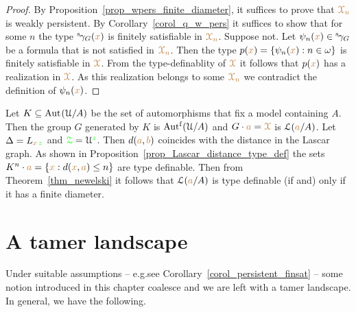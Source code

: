\begin{proof}
  By Proposition~\ref{prop_wpers_finite_diameter}, it suffices to prove that ${\color{brown}\EuScript X_n}$ is weakly persistent.
  By Corollary~\ref{corol_q_w_pers} it suffices to show that for some $n$ the type ${}^{\rm s}\kern-.2ex\gamma_G({\color{brown} x})$ is finitely satisfiable in ${\color{brown}\EuScript X_n}$.
  Suppose not.
  Let $\psi_n({\color{brown} x})\in{}^{\rm s}\kern-.2ex\gamma_G$ be a formula that is not satisfied in $\color{brown}\EuScript X_n$.
  Then the type $p({\color{brown} x})=\{\psi_n({\color{brown} x}):n\in\omega\}$ is finitely satisfiable in ${\color{brown}\EuScript X}$.
  From the type-definablity of ${\color{brown}\EuScript X}$ it follows that $p({\color{brown} x})$ has a realization in ${\color{brown}\EuScript X}$.
  As this realization belongs to some ${\color{brown}\EuScript X_n}$ we contradict the definition of $\psi_n({\color{brown} x})$. 
\end{proof}



\begin{example}\label{ex_newelski}
  Let $K\subseteq{\rm Aut\kern.15ex}(\EuScript U/A)$ be the set of automorphisms that fix a model containing $A$.
  Then the group $G$  generated by $K$ is $\mbox{Aut$^{\rm f}$}(\EuScript U/A)$ and $G\cdot{\color{brown}a}={\color{brown}\EuScript X}$ is $\EuScript L({\color{brown} a}/A)$.
  Let $\Delta=L_{{\color{brown} x}\,{\color{green} z}}$ and ${\color{green}\EuScript Z}=\EuScript U^{\color{green} z}$.
  Then $d({\color{brown} a},{\color{brown} b})$ coincides with the distance in the Lascar graph.
  As shown in Proposition~\ref{prop_Lascar_distance_type_def} the sets $K^n\cdot{\color{brown}a}=\{{\color{brown} x}:d({\color{brown} x},{\color{brown} a})\le n\}$ are type definable.
  Then from Theorem~\ref{thm_newelski} it follows that $\EuScript L({\color{brown} a}/A)$ is type definable (if and) only if it has a finite diameter.
\end{example} 

\section{A tamer landscape}\label{tame_landscape}

Under suitable assumptions -- e.g.\@ see Corollary~\ref{corol_persistent_finsat} -- some  notion introduced in this chapter coalesce and we are left with a tamer landscape.
In general, we have the following.


